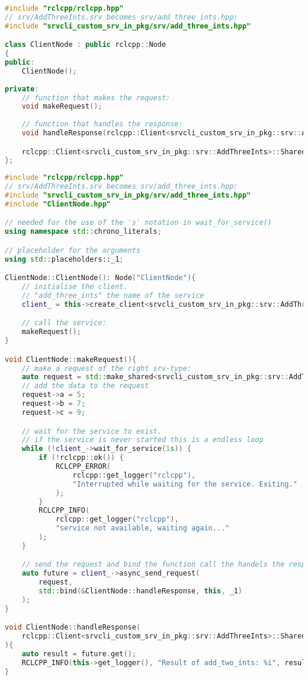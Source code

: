 \begin{lstlisting}[language=C++, caption={ClientNode.hpp}, firstnumber=0, label={code:client_hpp}]
#include "rclcpp/rclcpp.hpp"
// srv/AddThreeInts.srv becomes srv/add_three_ints.hpp:
#include "srvcli_custom_srv_in_pkg/srv/add_three_ints.hpp"

class ClientNode : public rclcpp::Node
{
public:
    ClientNode();
  
private:
    // function that makes the request:
    void makeRequest();
    
    // function that handles the response:
    void handleResponse(rclcpp::Client<srvcli_custom_srv_in_pkg::srv::AddThreeInts>::SharedFuture future);

    rclcpp::Client<srvcli_custom_srv_in_pkg::srv::AddThreeInts>::SharedPtr client_;
};

\end{lstlisting}


\begin{lstlisting}[language=C++, caption={ClientNode.cpp}, firstnumber=0, label={code:client_cpp}]
#include "rclcpp/rclcpp.hpp"
// srv/AddThreeInts.srv becomes srv/add_three_ints.hpp:
#include "srvcli_custom_srv_in_pkg/srv/add_three_ints.hpp"
#include "ClientNode.hpp"

// needed for the use of the 's' notation in wait_for_service()
using namespace std::chrono_literals;

// placeholder for the arguments
using std::placeholders::_1;

ClientNode::ClientNode(): Node("ClientNode"){
    // initialise the client.
    // "add_three_ints" the name of the service
    client_ = this->create_client<srvcli_custom_srv_in_pkg::srv::AddThreeInts>("add_three_ints");

    // call the service:
    makeRequest();
}

void ClientNode::makeRequest(){
    // make a request of the right srv-type:
    auto request = std::make_shared<srvcli_custom_srv_in_pkg::srv::AddThreeInts::Request>();
    // add the data to the request
    request->a = 5;
    request->b = 7;
    request->c = 9;

    // wait for the service to exist.
    // if the service is never started this is a endless loop
    while (!client_->wait_for_service(1s)) {
        if (!rclcpp::ok()) {
            RCLCPP_ERROR(
                rclcpp::get_logger("rclcpp"), 
                "Interrupted while waiting for the service. Exiting."
            );
        }
        RCLCPP_INFO(
            rclcpp::get_logger("rclcpp"), 
            "service not available, waiting again..."
        );
    }

    // send the request and bind the function call the handels the response
    auto future = client_->async_send_request(
        request, 
        std::bind(&ClientNode::handleResponse, this, _1)
    );
}

void ClientNode::handleResponse(
    rclcpp::Client<srvcli_custom_srv_in_pkg::srv::AddThreeInts>::SharedFuture future
){
    auto result = future.get();
    RCLCPP_INFO(this->get_logger(), "Result of add_two_ints: %i", result->sum);
}
\end{lstlisting}


